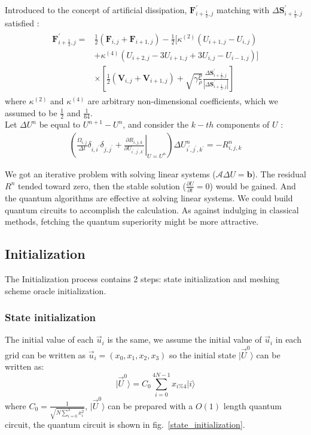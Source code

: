 \documentclass[%
 reprint,
 amsmath,amssymb,
pra,
]{revtex4-1}
\begin{document}
Introduced to the concept of artificial dissipation, $\bm{F}^\prime_{i+\frac{1}{2}, j}$ matching with $\Delta\bm{S}^\prime_{i+\frac{1}{2}, j}$ satisfied \cite{hirsch2007numerical} \cite{jameson1981numerical}:
\begin{align}
\begin{split}
    \bm{F}^\prime_{i+\frac{1}{2}, j} =& \frac{1}{2}\left(\bm{F}_{i, j} + \bm{F}_{i + 1, j}\right) - \frac{1}{2}\big[\kappa^{\left(2\right)}\left(U_{i+1, j}-U_{i, j}\right)\\
    &+\kappa^{\left(4\right)}\left(U_{i+2, j}-3 U_{i+1, j}+3 U_{i, j}-U_{i-1, j}\right)\big]\\
    &\times\left[\frac{1}{2}\left(\bm{V}_{i, j} + \bm{V}_{i + 1, j}\right) + \sqrt{\gamma \frac{p}{\rho}}\frac{\Delta\bm{S}^\prime_{i+\frac{1}{2}, j}}{\left|\Delta\bm{S}^\prime_{i+\frac{1}{2}, j}\right|}\right]
\end{split}
\end{align}
where $\kappa^{\left(2\right)}$ and $\kappa^{\left(4\right)}$ are arbitrary non-dimensional coefficients, which we assumed to be $\frac{1}{2}$ and $\frac{1}{64}$.\\
Let $\Delta U^{n}$ be equal to $U^{n+1}-U^{n}$, and consider the $k-th$ components of $U$ \cite{economon2015su2}:
\begin{align}
	\left(\frac{\Omega_{i, j}}{\Delta t}\delta_{i, i^\prime}\delta_{j, j^\prime}+\left.\frac{\partial R_{i,j,k}}{\partial U_{i^\prime,j^\prime,k^\prime}}\right|_{U=U^n}\right)\Delta U^{n}_{i^\prime,j^\prime,k^\prime} = -R^{n}_{i,j,k}
\end{align}

We got an iterative problem with solving linear systems ($\mathcal{A} \Delta U = \bm{b}$). The residual $R^{n}$ tended toward zero, then the stable solution ($\frac{\partial U}{\partial t} = 0$) would be gained. And the quantum algorithms are effective at solving linear systems. We could build quantum circuits to accomplish the calculation. As against indulging in classical methods, fetching the quantum superiority might be more attractive.



\subsection{Initialization}

The Initialization process contains 2 steps: state initialization and meshing scheme oracle initialization.
\subsubsection{State initialization}
The initial value of  each $\vec{u}_i$ is the same, we assume the initial value of $\vec{u}_i$ in each grid can be written as $\vec{u}_i=(x_0,x_1,x_2,x_3)$ so the initial state  $|\vec{U}^0\rangle$ can be written as:
$$
|\vec{U}^0\rangle=C_0\sum_{i=0}^{4N-1}{x_{i\%4}|i\rangle}
$$
where $C_0=\frac{1}{\sqrt{N\sum_{i=0}^{3}{x_i^2}}}$, $|\vec{U}^0\rangle$ can be prepared with a $O(1)$ length quantum circuit, the quantum circuit is shown in fig.~\ref{state_initialization}.
\end{document}
